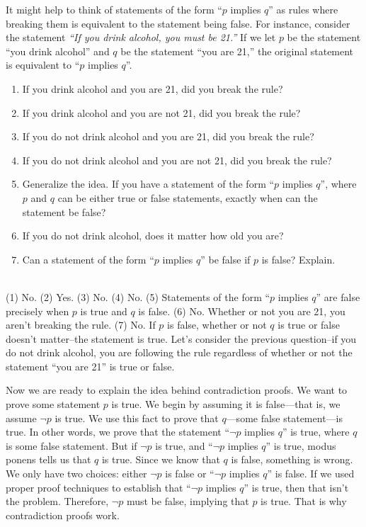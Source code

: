 \begin{exer}
It might help to think of statements of the form ``$p$ implies $q$'' as rules 
where breaking them is equivalent to the statement being false.
For instance, consider the statement {\em ``If you drink alcohol, you must be 21.''}
If we let $p$ be the statement ``you drink alcohol'' and $q$ be the statement ``you are 21,''
the original statement is equivalent to ``$p$ implies $q$''.  
\begin{enumerate}
\item If you drink alcohol and you are 21, did you break the rule?
\sblanklinefill
\item If you drink alcohol and you are not 21, did you break the rule?
\sblanklinefill
\item If you do not drink alcohol and you are 21, did you break the rule?
\sblanklinefill
\item If you do not drink alcohol and you are not 21, did you break the rule?
\sblanklinefill
\item
Generalize the idea.  If you have a statement of the form ``$p$ implies $q$'',
where $p$ and $q$ can be either true or false statements, exactly when can the statement be false?\\
\blanklinefill
\item
If you do not drink alcohol, does it matter how old you are?
\sblanklinefill
\item
Can a statement of the form ``$p$ implies $q$'' be false if $p$ is false?  Explain.\\
\blanklinefill\\
\blanklinefill
\end{enumerate}
\begin{answer}
(1) No. (2) Yes. (3) No. (4) No. 
(5) Statements of the form ``$p$ implies $q$'' are false
precisely when $p$ is true and $q$ is false.
(6)  No.  Whether or not you are 21, you aren't breaking the rule.
(7) No.  If $p$ is false, whether or not $q$ is true or false doesn't matter--the statement is true.
Let's consider the previous question--if you do not drink alcohol, you are following the rule
regardless of whether or not the statement ``you are 21'' is true or false.
\end{answer}
\end{exer}

Now we are ready to explain the idea behind contradiction proofs.  
We want to prove some statement $p$ is true. 
We begin by assuming it is false---that is, we assume $\neg p$ is true.
We use this fact to prove that $q$---some false statement---is true.  In other words, we
prove that the statement ``$\neg p$ implies $q$'' is true, where $q$ is some false statement.
But if $\neg p$ is true, and ``$\neg p$ implies $q$'' is true, modus ponens tells us that $q$ is true.
Since we know that $q$ is false, something is wrong.
We only have two choices: either $\neg p$ is false or ``$\neg p$ implies $q$'' is false.
If we used proper proof techniques to establish that ``$\neg p$ implies $q$'' is true, 
then that isn't the problem.  Therefore, $\neg p$ must be false, implying
that $p$ is true.  That is why contradiction proofs work.

